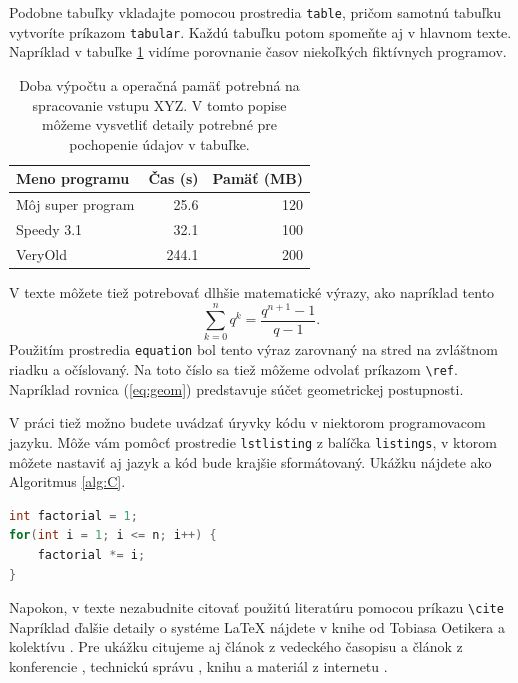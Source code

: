 Podobne tabuľky vkladajte pomocou prostredia \verb'table', pričom
samotnú tabuľku vytvoríte príkazom \verb'tabular'. Každú tabuľku potom
spomeňte aj v hlavnom texte. Napríklad v tabuľke \ref{tab:cas}
vidíme porovnanie časov niekoľkých fiktívnych programov.

\begin{table}
\caption[Doba výpočtu a operačná pamäť potrebná na spracovanie vstupu XYZ]{Doba výpočtu a operačná pamäť potrebná na spracovanie vstupu XYZ. V tomto popise môžeme vysvetliť detaily potrebné pre pochopenie údajov v tabuľke.}
\label{tab:cas}
\begin{center}
\begin{tabular}{lrr}
\hline 
Meno programu & Čas (s) & Pamäť (MB) \\
\hline
Môj super program & 25.6 & 120 \\
Speedy 3.1  & 32.1 & 100 \\
VeryOld & 244.1 & 200 \\
\hline
\end{tabular}
\end{center}
\end{table}

V texte môžete tiež potrebovať dlhšie matematické výrazy, ako napríklad tento
\begin{equation}
\sum_{k=0}^n q^k = \frac{q^{n+1}-1}{q-1}.
\label{eq:geom}
\end{equation}
Použitím prostredia \verb'equation' bol tento výraz zarovnaný na stred na
zvláštnom riadku a očíslovaný. Na toto číslo sa tiež môžeme odvolať
príkazom \verb'\ref'. Napríklad rovnica (\ref{eq:geom}) predstavuje súčet 
geometrickej postupnosti.

V práci tiež možno budete uvádzať úryvky kódu v niektorom programovacom jazyku. Môže vám pomôcť prostredie
\verb'lstlisting' z balíčka \verb'listings', v ktorom môžete nastaviť
aj jazyk a kód bude krajšie sformátovaný. Ukážku nájdete ako Algoritmus \ref{alg:C}.

\begin{lstlisting}[float,language=C,caption={Algoritmus na výpočet faktoriálu v jazyku C},label=alg:C]
int factorial = 1;
for(int i = 1; i <= n; i++) {
    factorial *= i;
}  
\end{lstlisting}

Napokon, v texte nezabudnite citovať použitú literatúru pomocou
príkazu \verb'\cite' Napríklad ďalšie detaily o systéme LaTeX nájdete
v knihe od Tobiasa Oetikera a kolektívu \cite{Oetiker2000}. Pre ukážku
citujeme aj článok z vedeckého časopisu \cite{clanok} a článok z
konferencie \cite{clanok_na_konferencii}, technickú správu
\cite{technical_report}, knihu \cite{kniha} a materiál z internetu
\cite{smernica}.


